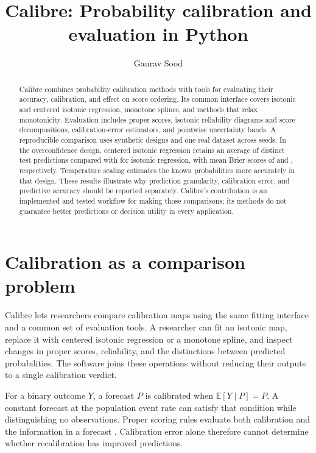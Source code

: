 \documentclass[11pt]{article}
\title{Calibre: Probability calibration and evaluation in Python}
\author{Gaurav Sood}
\date{}
\begin{document}
\maketitle
\begin{abstract}
Calibre combines probability calibration methods with tools for evaluating their accuracy, calibration, and effect on score ordering. Its common interface covers isotonic and centered isotonic regression, monotone splines, and methods that relax monotonicity. Evaluation includes proper scores, isotonic reliability diagrams and score decompositions, calibration-error estimators, and pointwise uncertainty bands. A reproducible comparison uses \BenchSynthetic{} synthetic designs and one real dataset across \BenchSeeds{} seeds. In the overconfidence design, centered isotonic regression retains an average of \CirDistinct{} distinct test predictions compared with \IsoDistinct{} for isotonic regression, with mean Brier scores of \CirBrier{} and \IsoBrier{}, respectively. Temperature scaling estimates the known probabilities more accurately in that design. These results illustrate why prediction granularity, calibration error, and predictive accuracy should be reported separately. Calibre's contribution is an implemented and tested workflow for making those comparisons; its methods do not guarantee better predictions or decision utility in every application.
\end{abstract}

\section{Calibration as a comparison problem}

Calibre lets researchers compare calibration maps using the same fitting interface and a common set of evaluation tools. A researcher can fit an isotonic map, replace it with centered isotonic regression or a monotone spline, and inspect changes in proper scores, reliability, and the distinctions between predicted probabilities. The software joins these operations without reducing their outputs to a single calibration verdict.

For a binary outcome $Y$, a forecast $P$ is calibrated when $\mathbb{E}[Y\mid P]=P$. A constant forecast at the population event rate can satisfy that condition while distinguishing no observations. Proper scoring rules evaluate both calibration and the information in a forecast \citep{degroot1983comparison,gneiting2007strictly}. Calibration error alone therefore cannot determine whether recalibration has improved predictions.
\end{document}
